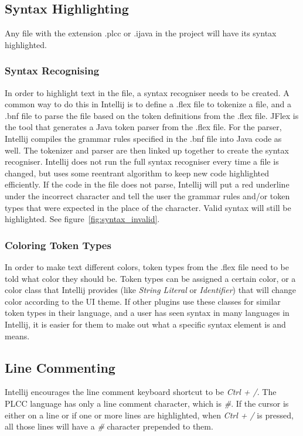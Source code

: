 \documentclass[conference, letterpaper]{IEEEtran}
\begin{document}
\subsection{Syntax Highlighting}\label{subsec:new-.plcc-file-syntax-highlighting}
Any file with the extension .plcc or .ijava in the project will have its syntax highlighted.

\subsubsection{Syntax Recognising}\label{subsubsec:syntax-recognising}
In order to highlight text in the file, a syntax recogniser needs to be created.
A common way to do this in Intellij is to define a .flex file to tokenize a file, and a .bnf file to parse the file based on the token definitions from the .flex file.
JFlex is the tool that generates a Java token parser from the .flex file.
For the parser, Intellij compiles the grammar rules specified in the .bnf file into Java code as well.
The tokenizer and parser are then linked up together to create the syntax recogniser.
Intellij does not run the full syntax recogniser every time a file is changed, but uses some reentrant algorithm to keep new code highlighted efficiently.
If the code in the file does not parse, Intellij will put a red underline under the incorrect character and tell the user the grammar rules and/or token types that were expected in the place of the character.
Valid syntax will still be highlighted.
See figure~\ref{fig:syntax_invalid}.

\subsubsection{Coloring Token Types}\label{subsubsec:coloring-token-types}
In order to make text different colors, token types from the .flex file need to be told what color they should be.
Token types can be assigned a certain color, or a color class that Intellij provides (like \textit{String Literal} or \textit{Identifier}) that will change color according to the UI theme.
If other plugins use these classes for similar token types in their language, and a user has seen syntax in many languages in Intellij, it is easier for them to make out what a specific syntax element is and means.

\subsection{Line Commenting}\label{subsec:line-commenting}
Intellij encourages the line comment keyboard shortcut to be \textit{Ctrl + /}.
The PLCC language has only a line comment character, which is \textit{\#}.
If the cursor is either on a line or if one or more lines are highlighted, when \textit{Ctrl + /} is pressed, all those lines will have a \textit{\#} character prepended to them.
\end{document}

